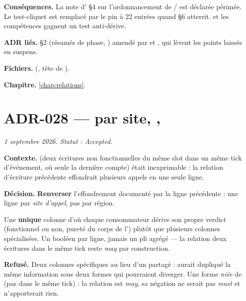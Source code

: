 \textbf{Conséquences.} La note d' §4 sur l'ordonnancement de
/ est déclarée périmée. Le test-cliquet
 est remplacé par le pin à 22 entrées quand §6
atterrit.  et les compétences 
gagnent un test anti-dérive.

\textbf{ADR liés.} §2 (résumés de phase, ) amendé par  et
, qui lèvent les points laissés en suspens.

\textbf{Fichiers.}  (, tête de
).

\textbf{Chapitre.} \cref{chap:relations}.

\section{ADR-028 ---  par site, , }
\label{adr:28}
\noindent\textit{1{\ier} septembre 2026. Statut : Accepted.}

\textbf{Contexte.}  (deux écritures non fonctionnelles du
même slot dans un même tick d'événement, où seule la dernière compte) était
inexprimable : la relation d'écriture précédente effondrait plusieurs appels
en une seule ligne.

\textbf{Décision.} \textbf{Renverser} l'effondrement documenté par la ligne
précédente : une ligne par \emph{site d'appel}, pas par région.


Une \textbf{unique} colonne  d'où chaque consommateur dérive son
propre verdict (fonctionnel ou non, pureté du corps de l')
plutôt que plusieurs colonnes spécialisées. Un booléen  par
ligne, jamais un pli agrégé --- la relation \og deux écritures dans le même
tick\fg{} reste \emph{may} par construction.

\textbf{Refusé.} Deux colonnes spécifiques au lieu d'un 
partagé : aurait dupliqué la même information sous deux formes qui pourraient
diverger. Une forme \emph{niée} de  (\og pas dans le même
tick\fg{}) : la relation est \emph{may}, sa négation ne serait pas
\emph{must} et n'apporterait rien.

